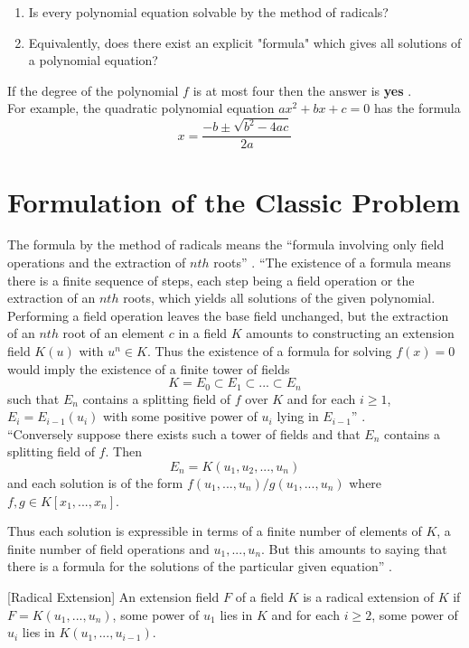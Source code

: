 \begin{enumerate}
\item Is every polynomial equation solvable by the method of radicals?
\item Equivalently, does there exist an explicit "formula" which gives all solutions of a polynomial equation?
\end{enumerate}

If the degree of  the polynomial \(f\) is at most four then the answer is \textbf{yes} \cite{hunger}.\\
For example, the quadratic polynomial equation \(ax^2+bx+c=0\) has the formula \[x=\frac{-b \pm \sqrt{b^2-4ac}}{2a}\]
\vspace{3mm}

\section{Formulation of the Classic Problem}
The formula by the method of radicals means the ``formula involving only field operations and the extraction of \(nth\) roots'' \cite{hunger}.
``The existence of a formula means there is a finite sequence of steps, each step being a field operation or the extraction of an \(nth\) roots, which yields all solutions of the given polynomial.
Performing a field operation leaves the base field unchanged, but the extraction of an \(nth\) root of an element
\(c\) in a field \(K\) amounts to constructing an extension field \(K(u)\) with \(u^n \in K\). Thus the existence of a formula for solving \(f(x)=0\) would imply
the existence of a finite tower of fields
\[K=E_0 \subset E_1 \subset ... \subset E_n\]
such that \(E_n\) contains a splitting field of \(f\) over \(K\) and for each \(i \geq 1\), \(E_i=E_{i-1}(u_i)\) with some positive power of \(u_i\) lying in \(E_{i-1}\)'' \cite{hunger}.\\
``Conversely suppose there exists such a tower of fields and that \(E_n\) contains a splitting field of \(f\). Then
\[E_n = K(u_1,u_2,...,u_n)\]
and each solution is of the form \(f(u_1,...,u_n)/g(u_1,...,u_n)\) where \(f,g \in K[x_1,...,x_n]\).
\clearpage

Thus each solution is expressible in terms of a finite number of elements of \(K\), a finite number of field operations and \(u_1,...,u_n\). But
this amounts to saying that there is a formula for the solutions of the particular given equation'' \cite{hunger}.
\vspace{3mm}

\begin{definition} \cite{hunger} [Radical Extension]
An extension field \(F\) of a field \(K\) is a radical extension of \(K\) if \(F=K(u_1,...,u_n)\), some power of \(u_1\) lies in \(K\) and for each \(i \geq 2\), some power of \(u_i\) lies in \(K(u_1,...,u_{i-1})\).
\end{definition}

